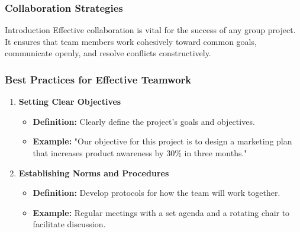 \documentclass[aspectratio=169]{beamer}
\begin{document}
\begin{frame}[fragile]
    \frametitle{Collaboration Strategies}
    \begin{block}{Introduction}
        Effective collaboration is vital for the success of any group project. It ensures that team members work cohesively toward common goals, communicate openly, and resolve conflicts constructively.
    \end{block}
\end{frame}

\begin{frame}[fragile]
    \frametitle{Best Practices for Effective Teamwork}
    \begin{enumerate}
        \item \textbf{Setting Clear Objectives}
        \begin{itemize}
            \item \textbf{Definition:} Clearly define the project's goals and objectives.
            \item \textbf{Example:} "Our objective for this project is to design a marketing plan that increases product awareness by 30\% in three months."
        \end{itemize}
        
        \item \textbf{Establishing Norms and Procedures}
        \begin{itemize}
            \item \textbf{Definition:} Develop protocols for how the team will work together.
            \item \textbf{Example:} Regular meetings with a set agenda and a rotating chair to facilitate discussion.
        \end{itemize}
    \end{enumerate}
\end{frame}
\end{document}
